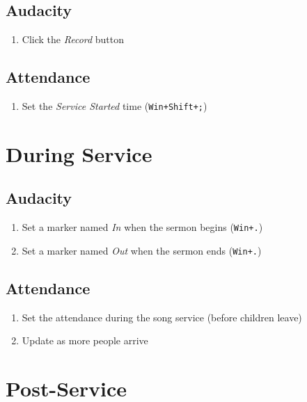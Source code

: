 \documentclass[12pt]{article}
\begin{document}
    \subsection{Audacity}
    \begin{enumerate}
        \item Click the \emph{Record} button
    \end{enumerate}

    \subsection{Attendance}
    \begin{enumerate}
        \item Set the \emph{Service Started} time (\texttt{Win+Shift+;})
    \end{enumerate}


\section{During Service}

    \subsection{Audacity}
    \begin{enumerate}
        \item Set a marker named \emph{In} when the sermon begins (\texttt{Win+.})
        \item Set a marker named \emph{Out} when the sermon ends (\texttt{Win+.})
    \end{enumerate}

    \subsection{Attendance}
    \begin{enumerate}
        \item Set the attendance during the song service (before children leave)
        \item Update as more people arrive
    \end{enumerate}


\section{Post-Service}

\end{document}
